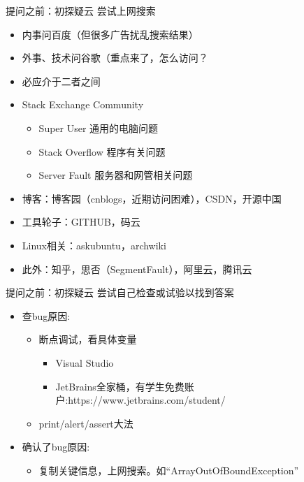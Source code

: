 \documentclass[10pt]{beamer}
\begin{document}
\begin{frame}[fragile]{提问之前：初探疑云}
    尝试上网搜索
    \begin{itemize}
        \item 内事问百度（但很多广告扰乱搜索结果）
        \item 外事、技术问谷歌（重点来了，怎么访问？
        \item 必应介于二者之间
        \item Stack Exchange Community
              \begin{itemize}
                  \item Super User 通用的电脑问题
                  \item Stack Overflow 程序有关问题
                  \item Server Fault 服务器和网管相关问题
              \end{itemize}
        \item 博客：博客园（cnblogs，近期访问困难），CSDN，开源中国
        \item 工具轮子：GITHUB，码云
        \item Linux相关：askubuntu，archwiki
        \item 此外：知乎，思否（SegmentFault），阿里云，腾讯云
    \end{itemize}
\end{frame}

\begin{frame}[fragile]{提问之前：初探疑云}
    尝试自己检查或试验以找到答案
    \begin{itemize}
        \item 查bug原因:
              \begin{itemize}
                  \item 断点调试，看具体变量
                        \begin{itemize}
                            \item Visual Studio
                            \item JetBrains全家桶，有学生免费账户:https://www.jetbrains.com/student/ 
                        \end{itemize}
                  \item print/alert/assert大法
              \end{itemize}
        \item 确认了bug原因:
        \begin{itemize}
            \item 复制关键信息，上网搜索。如“ArrayOutOfBoundException”
        \end{itemize}
    \end{itemize}
\end{frame}
\end{document}

